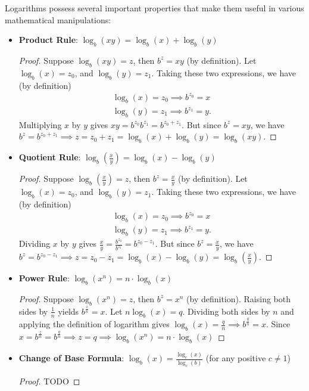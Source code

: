 Logarithms possess several important properties that make them useful in various mathematical manipulations:

\begin{itemize}
	\item \textbf{Product Rule}: $\log_b(xy) = \log_b(x) + \log_b(y)$
 	\begin{proof}
		Suppose $\log_b(xy) = z$, then $b^z = xy$ (by definition). Let $\log_b(x)=z_0$, and $\log_b(y) = z_1$. Taking these two expressions, we have (by definition)
		\begin{align}
		\log_b(x)=z_0 \implies b^{z_0} = x \\
		\log_b(y)=z_1 \implies b^{z_1} = y.
		\end{align}
		Multiplying $x$ by $y$ gives $xy = b^{z_0}b^{z_1} = b^{z_0+z_1}$. But since $b^z=xy$, we have $b^z = b^{z_0+z_1} \implies z = z_0+z_1 = \log_b(x) + \log_b(y) = \log_b(xy)$.
	\end{proof}
	\item \textbf{Quotient Rule}: $\log_b\left(\frac{x}{y}\right) = \log_b(x) - \log_b(y)$
 	\begin{proof}
		Suppose $\log_b\left(\frac{x}{y}\right) = z$, then $b^z = \frac{x}{y}$ (by definition). Let $\log_b(x)=z_0$, and $\log_b(y) = z_1$. Taking these two expressions, we have (by definition)
		\begin{align}
		\log_b(x)=z_0 \implies b^{z_0} = x \\
		\log_b(y)=z_1 \implies b^{z_1} = y.
		\end{align}
		Dividing $x$ by $y$ gives $\frac{x}{y} = \frac{b^{z_0}}{b^{z_1}} = b^{z_0-z_1}$. But since $b^z=\frac{x}{y}$, we have $b^z = b^{z_0-z_1} \implies z = z_0-z_1 = \log_b(x) - \log_b(y) = \log_b\left(\frac{x}{y}\right)$.
	\end{proof}
	\item \textbf{Power Rule}: $\log_b(x^n) = n \cdot \log_b(x)$
 	\begin{proof}
		Suppose $\log_b(x^n) = z$, then $b^z = x^n$ (by definition). Raising both sides by $\frac{1}{n}$ yields $b^{\frac{z}{n}}=x$. Let $n\log_b(x)=q$. Dividing both sides by $n$ and applying the definition of logarithm gives $\log_b(x) = \frac{q}{n}\implies b^{\frac{q}{n}} = x$. Since $x=b^{\frac{z}{n}} = b^{\frac{q}{n}} \implies z=q \implies \log_b(x^n) = n \cdot \log_b(x)$
	\end{proof}
	\item \textbf{Change of Base Formula}: $\log_b(x) = \frac{\log_c(x)}{\log_c(b)}$ (for any positive $c \neq 1$)
 		\begin{proof}
		TODO
	\end{proof}
\end{itemize}
